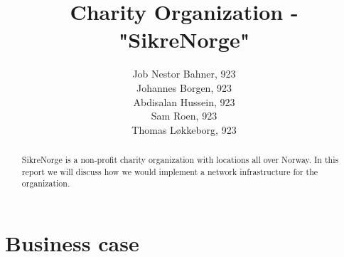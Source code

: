 


\title{Charity Organization - "SikreNorge"}

\author{
  Job Nestor Bahner, 923\\
  Johannes Borgen, 923\\
  Abdisalan Hussein, 923\\
  Sam Roen, 923\\
  Thomas Løkkeborg, 923
}



\maketitle

\begin{abstract}
  SikreNorge is a non-profit charity organization with locations all over Norway. In this report we will discuss how we would implement a network infrastructure for the organization.
\end{abstract}

\thispagestyle{empty}

\clearpage
{}
\setcounter{page}{1}
\tableofcontents

\clearpage
{}


\section{Business case}

